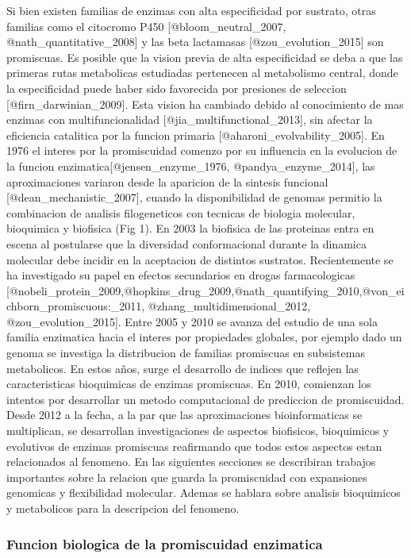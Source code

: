 \documentclass[]{article}
\begin{document}
Si bien existen familias de enzimas con alta especificidad por sustrato,
otras familias como el citocromo P450 {[}@bloom\_neutral\_2007,
@nath\_quantitative\_2008{]} y las beta lactamasas
{[}@zou\_evolution\_2015{]} son promiscuas. Es posible que la vision
previa de alta especificidad se deba a que las primeras rutas
metabolicas estudiadas pertenecen al metabolismo central, donde la
especificidad puede haber sido favorecida por presiones de seleccion
{[}@firn\_darwinian\_2009{]}. Esta vision ha cambiado debido al
conocimiento de mas enzimas con multifuncionalidad
{[}@jia\_multifunctional\_2013{]}, sin afectar la eficiencia catalitica
por la funcion primaria {[}@aharoni\_evolvability\_2005{]}. En 1976 el
interes por la promiscuidad comenzo por su influencia en la evolucion de
la funcion enzimatica{[}@jensen\_enzyme\_1976, @pandya\_enzyme\_2014{]},
las aproximaciones variaron desde la aparicion de la sintesis funcional
{[}@dean\_mechanistic\_2007{]}, cuando la disponibilidad de genomas
permitio la combinacion de analisis filogeneticos con tecnicas de
biologia molecular, bioquimica y biofisica (Fig 1). En 2003 la biofisica
de las proteinas entra en escena al postularse que la diversidad
conformacional durante la dinamica molecular debe incidir en la
aceptacion de distintos sustratos. Recientemente se ha investigado su
papel en efectos secundarios en drogas farmacologicas
{[}@nobeli\_protein\_2009,@hopkins\_drug\_2009,@nath\_quantifying\_2010,@von\_eichborn\_promiscuous:\_2011,
@zhang\_multidimensional\_2012, @zou\_evolution\_2015{]}. Entre 2005 y
2010 se avanza del estudio de una sola familia enzimatica hacia el
interes por propiedades globales, por ejemplo dado un genoma se
investiga la distribucion de familias promiscuas en subsistemas
metabolicos. En estos años, surge el desarrollo de indices que reflejen
las caracteristicas bioquimicas de enzimas promiscuas. En 2010,
comienzan los intentos por desarrollar un metodo computacional de
prediccion de promiscuidad. Desde 2012 a la fecha, a la par que las
aproximaciones bioinformaticas se multiplican, se desarrollan
investigaciones de aspectos biofisicos, bioquimicos y evolutivos de
enzimas promiscuas reafirmando que todos estos aspectos estan
relacionados al fenomeno. En las siguientes secciones se describiran
trabajos importantes sobre la relacion que guarda la promiscuidad con
expansiones genomicas y flexibilidad molecular. Ademas se hablara sobre
analisis bioquimicos y metabolicos para la descripcion del fenomeno.

\subsubsection{Funcion biologica de la promiscuidad
enzimatica}\label{funcion-biologica-de-la-promiscuidad-enzimatica}
\end{document}
